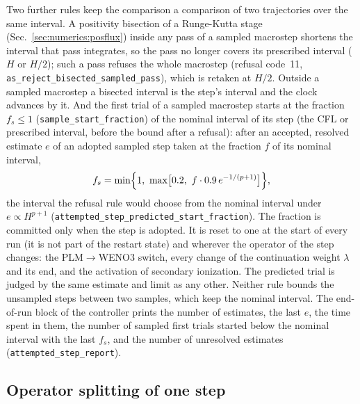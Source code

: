 Two further rules keep the comparison a comparison of two trajectories over
the same interval.  A positivity bisection of a Runge-Kutta stage
(Sec.~\ref{sec:numerics:posflux}) inside any pass of a sampled macrostep
shortens the interval that pass integrates, so the pass no longer covers its
prescribed interval ($H$ or $H/2$); such a pass refuses the whole macrostep
(refusal code~11, \texttt{as\_reject\_bisected\_sampled\_pass}), which is
retaken at $H/2$.  Outside a sampled macrostep a bisected interval is the
step's interval and the clock advances by it.  And the first trial of a
sampled macrostep starts at the fraction $f_s\le1$
(\texttt{sample\_start\_fraction}) of the nominal interval of its step (the
CFL or prescribed interval, before the bound after a refusal): after an
accepted, resolved estimate $e$ of an adopted sampled step taken at the
fraction $f$ of its nominal interval,
%
\begin{equation}
  f_s = \min\Bigl\{1,\ \max\bigl[0.2,\ f\cdot0.9\,e^{-1/(p+1)}\bigr]\Bigr\},
  \label{eq:sample_start}
\end{equation}
%
the interval the refusal rule would choose from the nominal interval under
$e\propto H^{p+1}$ (\texttt{attempted\_step\_predicted\_start\_fraction}).
The fraction is committed only when the step is adopted.  It is reset to one
at the start of every run (it is not part of the restart state) and wherever
the operator of the step changes: the PLM$\to$WENO3 switch, every change of
the continuation weight $\lambda$ and its end, and the activation of
secondary ionization.  The predicted trial is judged by the same estimate
and limit as any other.  Neither rule bounds the unsampled steps between two
samples, which keep the nominal interval.  The end-of-run block of the
controller prints the number of estimates, the last $e$, the time spent in
them, the number of sampled first trials started below the nominal interval
with the last $f_s$, and the number of unresolved estimates
(\texttt{attempted\_step\_report}).

\subsection{Operator splitting of one step}
\label{sec:numerics:split}

